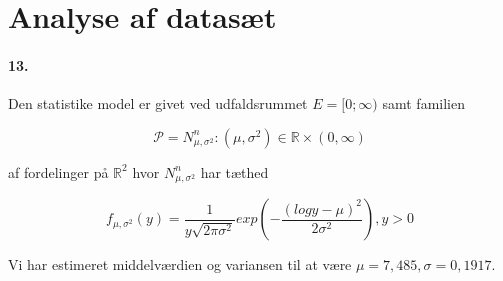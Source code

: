 \section{Analyse af datasæt}

\paragraph{13.}
Den statistike model er givet ved udfaldsrummet $E=[0; \infty)$ samt
familien

\begin{equation*}
  \mathcal{P} = N^n_{\mu,\sigma^2} : (\mu, \sigma^2) \in \mathbb{R}
  \times (0, \infty)
\end{equation*}

af fordelinger på $\mathbb{R}^2$ hvor $N^n_{\mu, \sigma^2}$ har tæthed

\begin{equation*}
  f_{\mu, \sigma^2}(y) = \frac{1}{y \sqrt{2\pi\sigma^2}} exp ( -
  \frac{(log y - \mu)^2}{2\sigma^2} ), y>0
\end{equation*}

Vi har estimeret middelværdien og variansen til at være $\mu = 7,485 ,
\sigma = 0,1917$.


